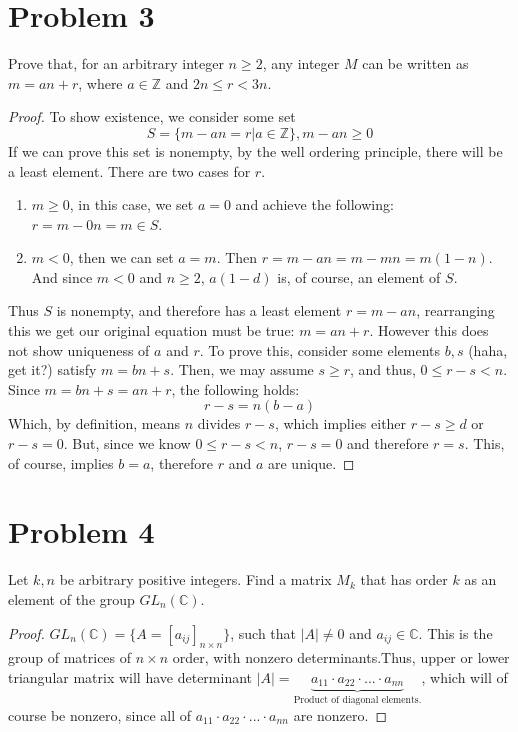 \documentclass[hidelinks,12pt]{article}
\newcommand{\C}{\mathbb{C}}
\newcommand{\Z}{\mathbb{Z}}
\begin{document}
\section{Problem 3}
Prove that, for an arbitrary integer $n\geq2$, any integer $M$ can be written as $m=an+r$, where $a\in\Z$ and $2n\leq r <3n$.\begin{proof}To show existence, we consider some set $$S=\{m-an=r|a\in\Z\},m-an\geq0$$ If we can prove this set is nonempty, by the well ordering principle, there will be a least element. There are two cases for $r$.\begin{enumerate}[label=(\roman*)]
    \item $m\geq0$, in this case, we set $a=0$ and achieve the following: $r=m-0n=m\in S$.
    \item $m<0$, then we can set $a=m$. Then $r=m-an=m-mn=m(1-n)$. And since $m<0$ and $n\geq2$, $a(1-d)$ is, of course, an element of $S$.
\end{enumerate}Thus $S$ is nonempty, and therefore has a least element $r=m-an$, rearranging this we get our original equation must be true: $m=an+r$.
\newline However this does not show uniqueness of $a$ and $r$.
To prove this, consider some elements $b,s$ (haha, get it?) satisfy $m=bn+s$. Then, we may assume $s\geq r$, and thus, $0\leq r-s<n$. Since $m=bn+s=an+r$, the following holds:$$r-s=n(b-a)$$Which, by definition, means $n$ divides $r-s$, which implies either $r-s\geq d$ or $r-s=0$. But, since we know $0\leq r-s<n$, $r-s=0$ and therefore $r=s$. This, of course, implies $b=a$, therefore $r$ and $a$ are unique.
\end{proof}
\section{Problem 4}
Let $k,n$ be arbitrary positive integers. Find a matrix $M_k$ that has order $k$ as an element of the group $GL_n(\C)$.\begin{proof}$GL_n(\C)=\{A=[a_{ij}]_{n\times n}\}$, such that $|A|\neq0$ and $a_{ij}\in\C$. This is the group of matrices of $n\times n$ order, with nonzero determinants.\newline Thus, upper or lower triangular matrix will have determinant $|A|=\underbrace{a_{11}\cdot a_{22}\cdot...\cdot a_{nn}}_{\text{Product of diagonal elements.}}$, which will of course be nonzero, since all of $a_{11}\cdot a_{22}\cdot...\cdot a_{nn}$ are nonzero.
\end{proof}
\end{document}
